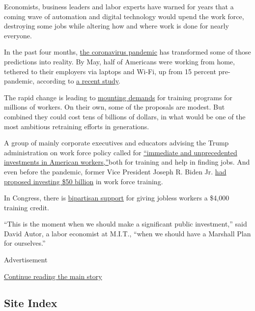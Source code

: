 Economists, business leaders and labor experts have warned for years
that a coming wave of automation and digital technology would upend the
work force, destroying some jobs while altering how and where work is
done for nearly everyone.

In the past four months,
\href{https://www.nytimes.com/news-event/coronavirus}{the coronavirus
pandemic} has transformed some of those predictions into reality. By
May, half of Americans were working from home, tethered to their
employers via laptops and Wi-Fi, up from 15 percent pre-pandemic,
according to \href{https://www.brynjolfsson.com/remotework/}{a recent
study}.

The rapid change is leading to
\href{https://www.nytimes.com/2020/07/13/business/coronavirus-retraining-workers.html}{mounting
demands} for training programs for millions of workers. On their own,
some of the proposals are modest. But combined they could cost tens of
billions of dollars, in what would be one of the most ambitious
retraining efforts in generations.

A group of mainly corporate executives and educators advising the Trump
administration on work force policy called for
\href{https://www.commerce.gov/sites/default/files/2020-05/AWPABCalltoActionFINAL051520.pdf}{``immediate
and unprecedented investments in American workers,''}both for training
and help in finding jobs. And even before the pandemic, former Vice
President Joseph R. Biden Jr.
\href{https://twitter.com/JoeBiden/status/1183170484269174784}{had
proposed investing \$50 billion} in work force training.

In Congress, there is
\href{https://www.klobuchar.senate.gov/public/index.cfm/2020/5/klobuchar-sasse-booker-scott-introduce-legislation-to-help-unemployed-american-workers-access-skills-training-programs-during-coronavirus-pandemic}{bipartisan
support} for giving jobless workers a \$4,000 training credit.

``This is the moment when we should make a significant public
investment,'' said David Autor, a labor economist at M.I.T., ``when we
should have a Marshall Plan for ourselves.''

Advertisement

\protect\hyperlink{after-bottom}{Continue reading the main story}

\hypertarget{site-index}{%
\subsection{Site Index}\label{site-index}}

